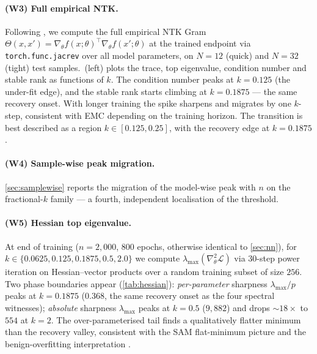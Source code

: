 \documentclass{article}
\begin{document}
\paragraph{(W3) Full empirical NTK.} Following \citet{jacot2018neural}, we compute the full empirical NTK Gram $\Theta(x,x') = \nabla_\theta f(x;\theta)^\top \nabla_\theta f(x';\theta)$ at the trained endpoint via \texttt{torch.func.jacrev} over all model parameters, on $N=12$ (quick) and $N=32$ (tight) test samples. \,(left) plots the trace, top eigenvalue, condition number and stable rank as functions of $k$. The condition number peaks at $k\!=\!0.125$ (the under-fit edge), and the stable rank starts climbing at $k\!=\!0.1875$ --- the same recovery onset. With longer training the spike sharpens and migrates by one $k$-step, consistent with EMC depending on the training horizon. The transition is best described as a region $k\!\in\![0.125, 0.25]$, with the recovery edge at $k\!=\!0.1875$.

\paragraph{(W4) Sample-wise peak migration.} \cref{sec:samplewise} reports the migration of the model-wise peak with $n$ on the fractional-$k$ family --- a fourth, independent localisation of the threshold.

\paragraph{(W5) Hessian top eigenvalue.} At end of training ($n\!=\!2{,}000$, 800 epochs, otherwise identical to \cref{sec:nn}), for $k\!\in\!\{0.0625, 0.125, 0.1875, 0.5, 2.0\}$ we compute $\lambda_{\max}(\nabla^2_\theta \mathcal{L})$ via 30-step power iteration on Hessian--vector products over a random training subset of size $256$. Two phase boundaries appear (\cref{tab:hessian}): \emph{per-parameter} sharpness $\lambda_{\max}/p$ peaks at $k\!=\!0.1875$ ($0.368$, the same recovery onset as the four spectral witnesses); \emph{absolute} sharpness $\lambda_{\max}$ peaks at $k\!=\!0.5$ ($9{,}882$) and drops $\sim 18\times$ to $554$ at $k\!=\!2$. The over-parameterised tail finds a qualitatively flatter minimum than the recovery valley, consistent with the SAM \citep{foret2021sharpness} flat-minimum picture and the benign-overfitting interpretation \citep{bartlett2020benign}.
\end{document}
